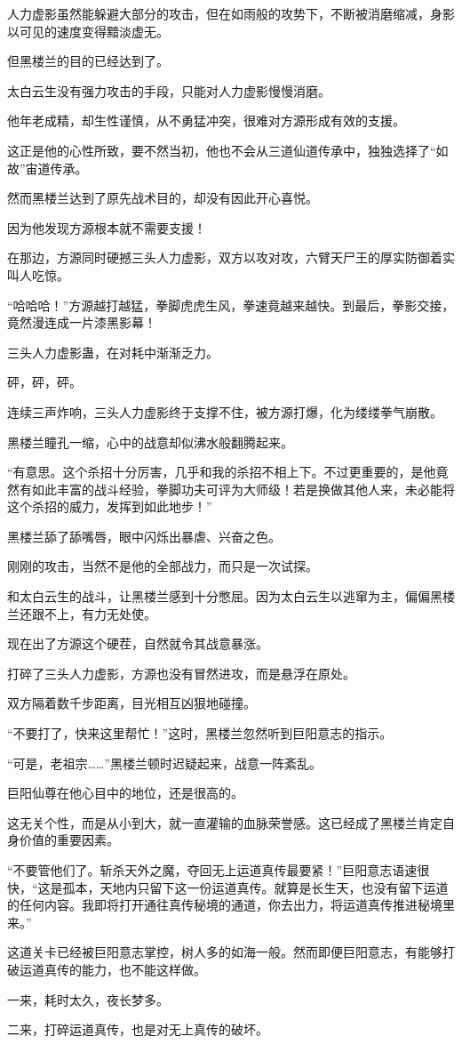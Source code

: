 \begin{this_body}
人力虚影虽然能躲避大部分的攻击，但在如雨般的攻势下，不断被消磨缩减，身影以可见的速度变得黯淡虚无。

但黑楼兰的目的已经达到了。

太白云生没有强力攻击的手段，只能对人力虚影慢慢消磨。

他年老成精，却生性谨慎，从不勇猛冲突，很难对方源形成有效的支援。

这正是他的心性所致，要不然当初，他也不会从三道仙道传承中，独独选择了“如故”宙道传承。

然而黑楼兰达到了原先战术目的，却没有因此开心喜悦。

因为他发现方源根本就不需要支援！

在那边，方源同时硬撼三头人力虚影，双方以攻对攻，六臂天尸王的厚实防御着实叫人吃惊。

“哈哈哈！”方源越打越猛，拳脚虎虎生风，拳速竟越来越快。到最后，拳影交接，竟然漫连成一片漆黑影幕！

三头人力虚影蛊，在对耗中渐渐乏力。

砰，砰，砰。

连续三声炸响，三头人力虚影终于支撑不住，被方源打爆，化为缕缕拳气崩散。

黑楼兰瞳孔一缩，心中的战意却似沸水般翻腾起来。

“有意思。这个杀招十分厉害，几乎和我的杀招不相上下。不过更重要的，是他竟然有如此丰富的战斗经验，拳脚功夫可评为大师级！若是换做其他人来，未必能将这个杀招的威力，发挥到如此地步！”

黑楼兰舔了舔嘴唇，眼中闪烁出暴虐、兴奋之色。

刚刚的攻击，当然不是他的全部战力，而只是一次试探。

和太白云生的战斗，让黑楼兰感到十分憋屈。因为太白云生以逃窜为主，偏偏黑楼兰还跟不上，有力无处使。

现在出了方源这个硬茬，自然就令其战意暴涨。

打碎了三头人力虚影，方源也没有冒然进攻，而是悬浮在原处。

双方隔着数千步距离，目光相互凶狠地碰撞。

“不要打了，快来这里帮忙！”这时，黑楼兰忽然听到巨阳意志的指示。

“可是，老祖宗……”黑楼兰顿时迟疑起来，战意一阵紊乱。

巨阳仙尊在他心目中的地位，还是很高的。

这无关个性，而是从小到大，就一直灌输的血脉荣誉感。这已经成了黑楼兰肯定自身价值的重要因素。

“不要管他们了。斩杀天外之魔，夺回无上运道真传最要紧！”巨阳意志语速很快，“这是孤本，天地内只留下这一份运道真传。就算是长生天，也没有留下运道的任何内容。我即将打开通往真传秘境的通道，你去出力，将运道真传推进秘境里来。”

这道关卡已经被巨阳意志掌控，树人多的如海一般。然而即便巨阳意志，有能够打破运道真传的能力，也不能这样做。

一来，耗时太久，夜长梦多。

二来，打碎运道真传，也是对无上真传的破坏。

\end{this_body}


